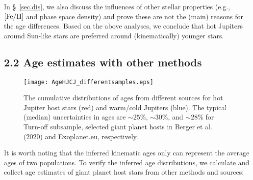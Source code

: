 \documentclass[twocolumn]{pnas-new}
\begin{document}
In \S~\ref{sec.dis}, we also discuss the influences of other stellar properties (e.g., $\rm [Fe/H]$ and phase space density) and prove these are not the (main) reasons for the age differences. 
Based on the above analyses, we conclude that hot Jupiters around Sun-like stars are preferred around (kinematically) younger stars.

\subsection*{2.2 Age estimates with other methods}
\label{sec.obs.isoage}

\begin{figure}[!t]
\centering
\texttt{[image: AgeHJCJ\_differentsamples.eps]}
\caption{The cumulative distributions of ages from different sources for hot Jupiter host stars (red) and warm/cold Jupiters (blue).
{The typical (median) uncertainties in ages are $\sim 25\%$, $\sim 30\%$, and $\sim 28\%$ for Turn-off subsample, selected giant planet hosts in Berger et al. (2020) and Exoplanet.eu, respectively.}
\label{figAgeHJCJ_othersource}}
\end{figure}

It is worth noting that the inferred kinematic ages only can represent the average ages of two populations.
To verify the inferred age distributions, we calculate and collect age estimates of giant planet host stars from other methods and sources: 
\end{document}
